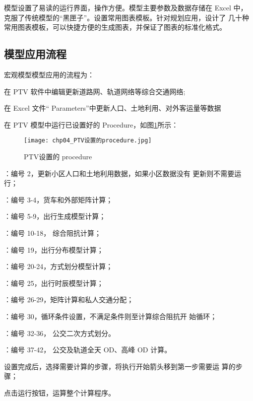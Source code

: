 模型设置了易读的运行界面，操作方便。模型主要参数及数据存储在 Excel
中，克服了传统模型的“黑匣子”。设置常用图表模板。针对规划应用，设计了
几十种常用图表模板，可以快捷方便的生成图表，并保证了图表的标准化格式。

\subsection{模型应用流程}
宏观模型模型应用的流程为：
\begin{nbeae}
\item 在 PTV 软件中编辑更新道路网、轨道网络等综合交通网络;
\item 在 Excel 文件“ Parameters”中更新人口、土地利用、对外客运量等数据
\item 在 PTV 模型中运行已设置好的 Procedure，如图\ref{fig:chp04_PTV设置的procedure.jpg}所示：
\end{nbeae}

\begin{figure}[ht]
  \centering
  \texttt{[image: chp04\_PTV设置的procedure.jpg]}
  \caption{PTV设置的 procedure\label{fig:chp04_PTV设置的procedure.jpg} }
\end{figure}

\begin{cit}
\item {}：编号 2，更新小区人口和土地利用数据，如果小区数据没有
更新则不需要运行；
\item {}：编号 3-4，货车和外部矩阵计算；
\item {}：编号 5-9，出行生成模型计算；
\item {}：编号 10-18， 综合阻抗计算；
\item {}：编号 19，出行分布模型计算；
\item {}：编号 20-24，方式划分模型计算；
\item {}：编号 25，出行时辰模型计算；
\item {}：编号 26-29，矩阵计算和私人交通分配；
\item {}：编号 30，循环条件设置，不满足条件则至计算综合阻抗开
始循环；
\item {}：编号 32-36， 公交二次方式划分。
\item {}：编号 37-42， 公交及轨道全天 OD、高峰 OD 计算。
\item 设置完成后，选择需要计算的步骤，将执行开始箭头移到第一步需要运
算的步骤；
\item 点击运行按钮，运算整个计算程序。
\end{cit}

